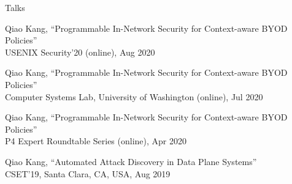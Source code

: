 \documentclass{resume} %
\begin{document}
\begin{rSection}{Talks}

\item Qiao Kang, ``Programmable In-Network Security for Context-aware BYOD Policies'' \\
USENIX Security'20 (online), Aug 2020

\item Qiao Kang, ``Programmable In-Network Security for Context-aware BYOD Policies'' \\
Computer Systems Lab, University of Washington (online), Jul 2020

\item Qiao Kang, ``Programmable In-Network Security for Context-aware BYOD Policies'' \\
P4 Expert Roundtable Series (online), Apr 2020

\item Qiao Kang, ``Automated Attack Discovery in Data Plane Systems'' \\
CSET'19, Santa Clara, CA, USA, Aug 2019

\end{rSection}




\end{document}
